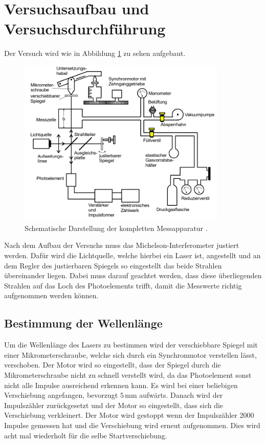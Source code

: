 \section{Versuchsaufbau und Versuchsdurchführung}

\begin{flushleft}
    Der Versuch wird wie in Abbildung \ref{Abbildung4} zu sehen aufgebaut.
\end{flushleft}

\begin{figure}[H]
    \centering
    \includegraphics[height=80mm]{bilder/Ab4.png}
    \caption{Schematische Darstellung der kompletten Messapparatur \cite{a1}. \label{Abbildung4} }
\end{figure}

\begin{flushleft}
    Nach dem Aufbau der Versuchs muss das Michelson-Interferometer justiert werden. 
    Dafür wird die Lichtquelle, welche hierbei ein Laser ist, angestellt und an dem Regler des justierbaren Spiegels so eingestellt das beide Strahlen übereinander liegen.
    Dabei muss darauf geachtet werden, dass diese überliegenden Strahlen auf das Loch des Photoelements trifft, damit die Messwerte richtig aufgenommen werden können.
\end{flushleft}

\subsection{Bestimmung der Wellenlänge}

\begin{flushleft}
    Um die Wellenlänge des Lasers zu bestimmen wird der verschiebbare Spiegel mit einer Mikrometerschraube, welche sich durch ein Synchronmotor verstellen lässt, verschoben.
    Der Motor wird so eingestellt, dass der Spiegel durch die Mikrometerschraube nicht zu schnell verstellt wird, da das Photoelement sonst nicht alle Impulse ausreichend erkennen kann.
    Es wird bei einer beliebigen Verschiebung angefangen, bevorzugt $5\,\unit{\milli\meter}$ aufwärts. 
    Danach wird der Impulszähler zurückgesetzt und der Motor so eingestellt, dass sich die Verschiebung verkleinert.
    Der Motor wird gestoppt wenn der Impulszähler 2000 Impulse gemessen hat und die Verschiebung wird erneut aufgenommen.
    Dies wird acht mal wiederholt für die selbe Startverschiebung. 
\end{flushleft}

